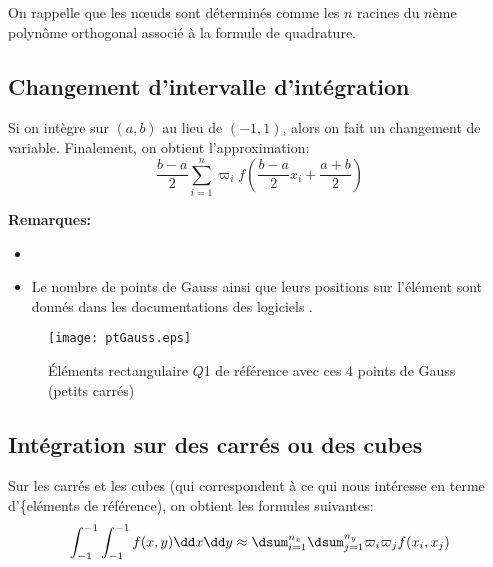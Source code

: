 On rappelle que les nœuds sont déterminés comme les $n$ racines du $n$ème 
polynôme orthogonal associé à la formule de quadrature.

\medskip
{}

\medskip
\subsection*{Changement d'intervalle d'intégration}

Si on intègre sur $(a,b)$ au lieu de $(-1,1)$, alors on fait un changement de
variable.
Finalement, on obtient l'approximation:
\begin{equation}   \frac{b-a}{2} \sum_{i=1}^n \varpi_i f\left(\frac{b-a}{2}x_i + \frac{a+b}{2}\right)  \end{equation}

\medskip
\textbf{Remarques:}
\begin{itemize}
\item {}
\item Le nombre de points de Gauss ainsi que leurs positions sur l'élément sont donnés dans 
les documentations des logiciels .
\end{itemize}

\begin{figure}[ht]
\begin{center}
\texttt{[image: ptGauss.eps]}
\end{center}
\caption{\label{ptGauss} Éléments rectangulaire $Q$1 de référence avec ces 4 points de Gauss (petits carrés)}
\end{figure}

\medskip
\subsection*{Intégration sur des carrés ou des cubes}

Sur les carrés et les cubes (qui correspondent à ce qui nous intéresse en terme
d'\{eléments de référence), on obtient les formules suivantes:
\begin{equation} \int_{-1}^{-1}\int_{-1}^{-1} f(x,y)\dd x\dd y \approx
\dsum_{i=1}^{n_x}\dsum_{j=1}^{n_y} \varpi_i\varpi_j f(x_i,x_j)\end{equation}

